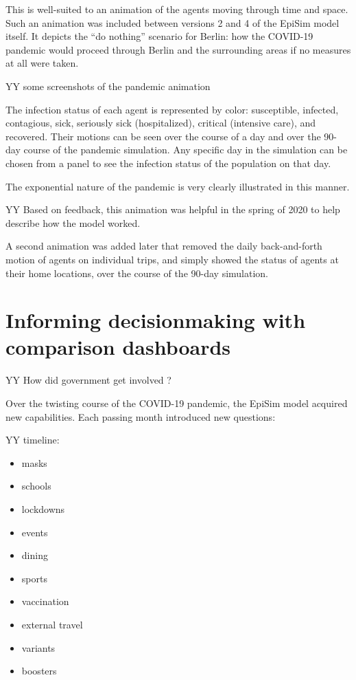 This is well-suited to an animation of the agents moving through time and space. Such an animation was included between versions 2 and 4 of the EpiSim model itself. It depicts the ``do nothing'' scenario for Berlin: how the COVID-19 pandemic would proceed through Berlin and the surrounding areas if no measures at all were taken.

YY some screenshots of the pandemic animation

The infection status of each agent is represented by color: susceptible, infected, contagious, sick, seriously sick (hospitalized), critical (intensive care), and recovered. Their motions can be seen over the course of a day and over the 90-day course of the pandemic simulation. Any specific day in the simulation can be chosen from a panel to see the infection status of the population on that day.

The exponential nature of the pandemic is very clearly illustrated in this manner.

YY Based on feedback, this animation was helpful in the spring of 2020 to help describe how the model worked.

A second animation was added later that removed the daily back-and-forth motion of agents on individual trips, and simply showed the status of agents at their home locations, over the course of the 90-day simulation.

\hypertarget{informing-decisionmaking-with-comparison-dashboards}{%
\section{Informing decisionmaking with comparison dashboards}\label{informing-decisionmaking-with-comparison-dashboards}}

YY How did government get involved ?

Over the twisting course of the COVID-19 pandemic, the EpiSim model acquired new capabilities. Each passing month introduced new questions:

YY timeline:

\begin{itemize}
\item
  masks
\item
  schools
\item
  lockdowns
\item
  events
\item
  dining
\item
  sports
\item
  vaccination
\item
  external travel
\item
  variants
\item
  boosters
\end{itemize}

